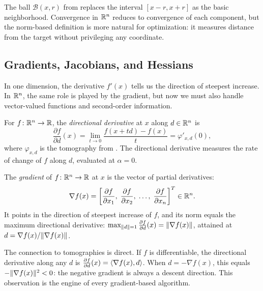 The ball $\mathcal{B}(x, r)$ from  replaces the interval $[x - r, x + r]$ as the basic neighborhood.
Convergence in $\mathbb{R}^n$ reduces to convergence of each component, but the norm-based definition is more natural for optimization: it measures distance from the target without privileging any coordinate.


\subsection{Gradients, Jacobians, and Hessians}\label{sec:grad-hess}

In one dimension, the derivative $f'(x)$ tells us the direction of steepest increase.
In $\mathbb{R}^n$, the same role is played by the gradient, but now we must also handle vector-valued functions and second-order information.

\begin{definition}\label{def:dir-deriv}
	For $f \colon \mathbb{R}^n \to \mathbb{R}$, the \emph{directional derivative} at $x$ along $d \in \mathbb{R}^n$ is
	\begin{equation}\label{eq:directional-derivative}
		\frac{\partial f}{\partial d}(x)
		= \lim_{t \to 0} \frac{f(x + td) - f(x)}{t}
		= \varphi'_{x,d}(0),
	\end{equation}
	where $\varphi_{x,d}$ is the tomography from .
	The directional derivative measures the rate of change of $f$ along $d$, evaluated at $\alpha = 0$.
\end{definition}

\begin{definition}[Gradient]\label{def:gradient}
	The \emph{gradient} of $f \colon \mathbb{R}^n \to \mathbb{R}$ at $x$ is the vector of partial derivatives:
	\begin{equation}\label{eq:gradient}
		\nabla f(x)
		= \left[\frac{\partial f}{\partial x_1},\;
			\frac{\partial f}{\partial x_2},\;
			\dots,\;
			\frac{\partial f}{\partial x_n}\right]^T \in \mathbb{R}^n.
	\end{equation}
	It points in the direction of steepest increase of $f$, and its norm equals the maximum directional derivative: $\max_{\lVert d\rVert=1} \frac{\partial f}{\partial d}(x) = \lVert\nabla f(x)\rVert$, attained at $d = \nabla f(x) / \lVert\nabla f(x)\rVert$.
\end{definition}

The connection to tomographies is direct.
If $f$ is differentiable, the directional derivative along any $d$ is $\frac{\partial f}{\partial d}(x) = \langle\nabla f(x), d\rangle$.
When $d = -\nabla f(x)$, this equals $-\lVert\nabla f(x)\rVert^2 < 0$: the negative gradient is always a descent direction.
This observation is the engine of every gradient-based algorithm.

